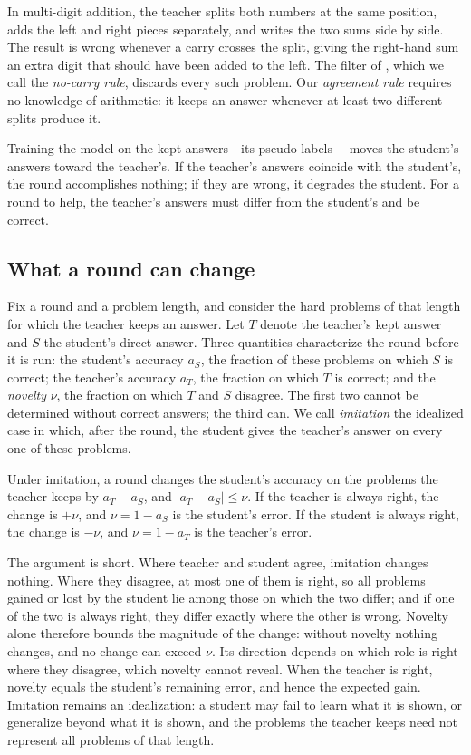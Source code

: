 In multi-digit addition, the teacher splits both numbers at the same position,
adds the left and right pieces separately, and writes the two sums side by
side. The result is wrong whenever a carry crosses the split, giving the
right-hand sum an extra digit that should have been added to the left. The
filter of \citet{shin2026compositional}, which we call the \emph{no-carry
rule}, discards every such problem. Our \emph{agreement rule} requires no
knowledge of arithmetic: it keeps an answer whenever at least two different
splits produce it.

Training the model on the kept answers---its pseudo-labels
\citep{lee2013pseudolabel}---moves the student's answers toward the teacher's.
If the teacher's answers coincide with the student's, the round accomplishes
nothing; if they are wrong, it degrades the student. For a round to help, the
teacher's answers must differ from the student's and be correct.

\subsection{What a round can change}
\label{sec:what-changes}

Fix a round and a problem length, and consider the hard problems of that length
for which the teacher keeps an answer. Let $T$ denote the teacher's kept answer
and $S$ the student's direct answer. Three quantities characterize the round
before it is run: the student's accuracy $a_S$, the fraction of these problems
on which $S$ is correct; the teacher's accuracy $a_T$, the fraction on which
$T$ is correct; and the \emph{novelty} $\nu$, the fraction on which $T$ and $S$
disagree. The first two cannot be determined without correct answers; the third
can. We call \emph{imitation} the idealized case in which, after the round, the
student gives the teacher's answer on every one of these problems.

\begin{proposition}
\label{prop:novelty}
Under imitation, a round changes the student's accuracy on the problems the
teacher keeps by $a_T - a_S$, and $|a_T - a_S| \le \nu$. If the teacher is
always right, the change is $+\nu$, and $\nu = 1 - a_S$ is the student's error.
If the student is always right, the change is $-\nu$, and $\nu = 1 - a_T$ is
the teacher's error.
\end{proposition}

The argument is short. Where teacher and student agree, imitation changes
nothing. Where they disagree, at most one of them is right, so all problems
gained or lost by the student lie among those on which the two differ; and if
one of the two is always right, they differ exactly where the other is wrong.
Novelty alone therefore bounds the magnitude of the change: without novelty
nothing changes, and no change can exceed $\nu$. Its direction depends on which
role is right where they disagree, which novelty cannot reveal. When the
teacher is right, novelty equals the student's remaining error, and hence the
expected gain. Imitation remains an idealization: a student may fail to learn
what it is shown, or generalize beyond what it is shown, and the problems the
teacher keeps need not represent all problems of that length.

